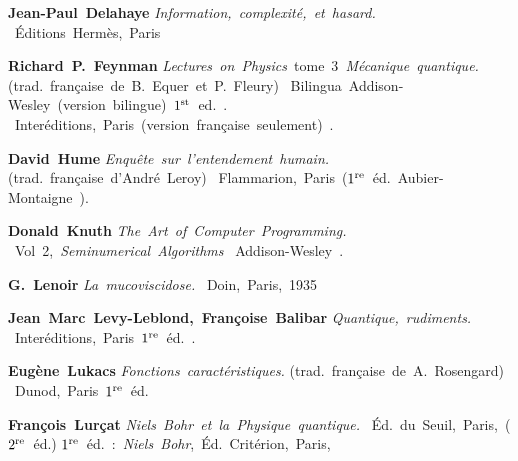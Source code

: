 \vbox{\hbox{{\bf Jean-Paul Delahaye}}
\smallskip 
\hbox{\hskip30pt\it Information,
complexit\'e, et hasard.} 
\smallskip 
\hbox{\hskip42pt \'Editions Herm\`es, Paris \hskip10pt {} } }  
\bigskip\filbreak 
 
\vbox{\hbox{{\bf Richard P. Feynman}} 
\smallskip 
\hbox{{\hskip30pt\it Lectures  on  Physics}\hskip15pt tome 3 
{\hskip5pt\it M\'ecanique quantique.}} 
\hbox{\hskip55pt(trad. fran\c caise de B. Equer et P. Fleury)}  
\smallskip 
\hbox{\hskip42pt Bilingua Addison-Wesley (version bilingue)\hskip10pt  
$1^{\rm st}$ ed. {}.} 
\hbox{\hskip42pt Inter\'editions, Paris (version fran\c caise seulement) 
\hskip10pt  {}.} } 
\bigskip\filbreak 
 
\vbox{\hbox{{\bf David Hume}}
\smallskip 
\hbox{\hskip30pt\it Enqu\^ete sur l'entendement humain.}  
\hbox{\hskip55pt(trad. fran\c caise d'Andr\'e Leroy)} 
\smallskip 
\hbox{\hskip42pt Flammarion, Paris {}\hskip10pt  
($1^{\rm re}$ \'ed. Aubier-Montaigne {}).} } 
\bigskip\filbreak 
 
\vbox{\hbox{{\bf Donald Knuth}} 
\smallskip 
\hbox{\hskip30pt\it The Art of Computer Programming.}  
\hbox{\hskip55pt Vol 2, {\it Seminumerical Algorithms}} 
\smallskip 
\hbox{\hskip42pt Addison-Wesley {}.} } 
\bigskip\filbreak 
 
\vbox{\hbox{{\bf G. Lenoir}}
\smallskip 
\hbox{\hskip30pt\it La mucoviscidose.}  
\smallskip 
\hbox{\hskip42pt Doin, Paris, 1935} } 
\bigskip\filbreak 
 
\vbox{\hbox{{\bf Jean Marc Levy-Leblond, Fran\c coise Balibar}}  
\smallskip 
\hbox{\hskip30pt\it Quantique, rudiments. }  
\smallskip 
\hbox{\hskip42pt Inter\'editions, 
Paris\hskip10pt $1^{\rm re}$ \'ed. {}.} } 
\bigskip\filbreak 
 
\vbox{\hbox{{\bf Eug\`ene Lukacs}}
\smallskip 
\hbox{\hskip30pt\it Fonctions caract\'eristiques.}  
\hbox{\hskip55pt(trad. fran\c caise de A. Rosengard)} 
\smallskip 
\hbox{\hskip42pt Dunod, Paris \hskip10pt $1^{\rm re}$ \'ed.  
{}} }  
\bigskip\filbreak 
 
\vbox{\hbox{{\bf Fran\c cois Lur\c cat}}
\smallskip 
\hbox{\hskip30pt\it Niels Bohr et la Physique quantique.} 
\smallskip 
\hbox{\hskip42pt \'Ed. du Seuil,  Paris,  \hskip10pt   
{} \hskip10pt  ($2^{\rm re}$ \'ed.)} 
\medskip 
\hbox{\hskip30pt$1^{\rm re}$ \'ed. : {\it Niels Bohr},  
\'Ed. Crit\'erion, Paris, \hskip10pt   {}} } 
\bigskip\filbreak 
 
